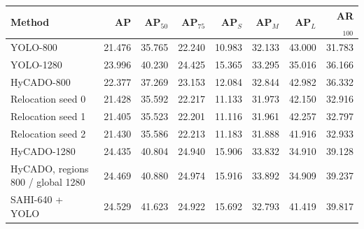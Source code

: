 \begin{tabular}{lrrrrrrr}
\toprule
Method & AP & AP$_{50}$ & AP$_{75}$ & AP$_S$ & AP$_M$ & AP$_L$ & AR$_{100}$\\
\midrule
YOLO-800 & 21.476 & 35.765 & 22.240 & 10.983 & 32.133 & 43.000 & 31.783\\
YOLO-1280 & 23.996 & 40.230 & 24.425 & 15.365 & 33.295 & 35.016 & 36.166\\
HyCADO-800 & 22.377 & 37.269 & 23.153 & 12.084 & 32.844 & 42.982 & 36.332\\
Relocation seed 0 & 21.428 & 35.592 & 22.217 & 11.133 & 31.973 & 42.150 & 32.916\\
Relocation seed 1 & 21.405 & 35.523 & 22.201 & 11.116 & 31.961 & 42.257 & 32.797\\
Relocation seed 2 & 21.430 & 35.586 & 22.213 & 11.183 & 31.888 & 41.916 & 32.933\\
HyCADO-1280 & 24.435 & 40.804 & 24.940 & 15.906 & 33.832 & 34.910 & 39.128\\
HyCADO, regions 800 / global 1280 & 24.469 & 40.880 & 24.974 & 15.916 & 33.892 & 34.909 & 39.237\\
SAHI-640 + YOLO & 24.529 & 41.623 & 24.922 & 15.692 & 32.793 & 41.419 & 39.817\\
\bottomrule
\end{tabular}
